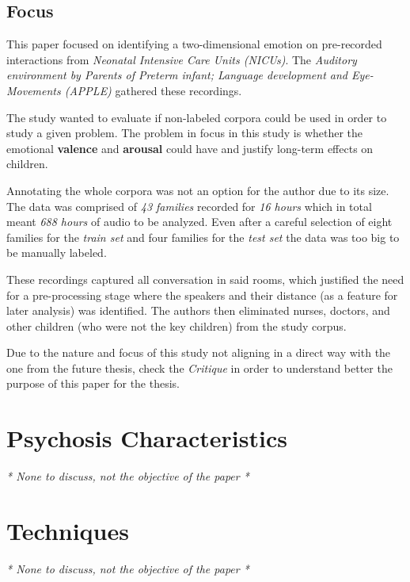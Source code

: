 \documentclass{Paper_Summary}
\begin{document}
\makepapertitle

\breakline

\begin{center}
    \section*{Focus}
\end{center}

    This paper focused on identifying a two-dimensional emotion on pre-recorded interactions from \emph{Neonatal Intensive Care Units (NICUs)}. The \emph{Auditory environment by Parents of Preterm infant; Language development and Eye-Movements (APPLE)} gathered these recordings.

    The study wanted to evaluate if non-labeled corpora could be used in order to study a given problem. The problem in focus in this study is whether the emotional \textbf{valence} and \textbf{arousal} could have and justify long-term effects on children.

    Annotating the whole corpora was not an option for the author due to its size. The data was comprised of \emph{43 families} recorded for \emph{16 hours} which in total meant \emph{688 hours} of audio to be analyzed. Even after a careful selection of eight families for the \emph{train set} and four families for the \emph{test set} the data was too big to be manually labeled.

    These recordings captured all conversation in said rooms, which justified the need for a pre-processing stage where the speakers and their distance (as a feature for later analysis) was identified. The authors then eliminated nurses, doctors, and other children (who were not the key children) from the study corpus.

    Due to the nature and focus of this study not aligning in a direct way with the one from the future thesis, check the \emph{Critique} in order to understand better the purpose of this paper for the thesis.

    \vspace{-5mm}
\breakline

\newpage

\section{Psychosis Characteristics}
\emph{* None to discuss, not the objective of the paper *}

\section{Techniques}
\emph{* None to discuss, not the objective of the paper *}
\end{document}
